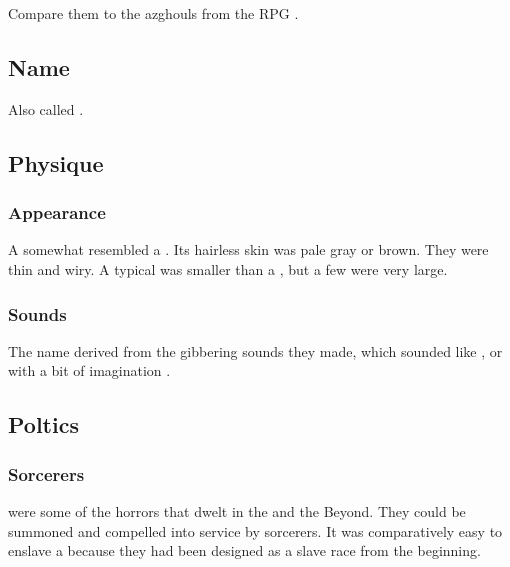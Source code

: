 Compare them to the azghouls from the RPG \cite{RPG:Kult}. 









\subsection{Name}
Also called .









\subsection{Physique}





\subsubsection{Appearance}
A \glithid somewhat resembled a \human.
Its hairless skin was pale gray or brown.
They were thin and wiry.
A typical \glithid was smaller than a \human, but a few were very large. 





\subsubsection{Sounds}
The name \quo{\glithid} derived from the gibbering sounds they made, which sounded like , or with a bit of imagination . 









\subsection{Poltics}





\subsubsection{Sorcerers}
\Glithids were some of the horrors that dwelt in the \wylde and the Beyond. 
They could be summoned and compelled into service by sorcerers.
It was comparatively easy to enslave a \glithid because they had been designed as a slave race from the beginning.









